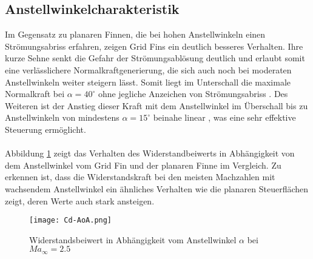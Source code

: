 \subsection{Anstellwinkelcharakteristik}
Im Gegensatz zu planaren Finnen, die bei hohen Anstellwinkeln einen Strömungsabriss erfahren, zeigen Grid Fins ein deutlich besseres Verhalten. Ihre kurze Sehne senkt die Gefahr der Strömungsablösung deutlich und erlaubt somit eine verlässlichere Normalkraftgenerierung, die sich auch noch bei moderaten Anstellwinkeln weiter steigern lässt. Somit liegt im Unterschall die maximale Normalkraft bei $\alpha = 40^\circ$ ohne jegliche Anzeichen von Strömungsabriss \cite{synopsis}.
Des Weiteren ist der Anstieg dieser Kraft mit dem Anstellwinkel im Überschall bis zu Anstellwinkeln von mindestens $\alpha=15^\circ$ beinahe linear \cite{synopsis}, was eine sehr effektive Steuerung ermöglicht.\\
~\\
Abbildung \ref{abb_Cd-AoA} zeigt das Verhalten des Widerstandbeiwerts in Abhängigkeit von dem Anstellwinkel vom Grid Fin und der planaren Finne im Vergleich.
Zu erkennen ist, dass die Widerstandskraft bei den meisten Machzahlen mit wachsendem Anstellwinkel ein ähnliches Verhalten wie die planaren Steuerflächen \cite{vergleichPlanarNATO} zeigt, deren Werte auch stark ansteigen.
\begin{figure}[h]
	\centering
	\texttt{[image: Cd-AoA.png]}
	\begin{flushright}
	\end{flushright}
	\caption{Widerstandsbeiwert in Abhängigkeit vom Anstellwinkel $\alpha$ bei $Ma_\infty=2.5$}
	\label{abb_Cd-AoA}
\end{figure}\\

